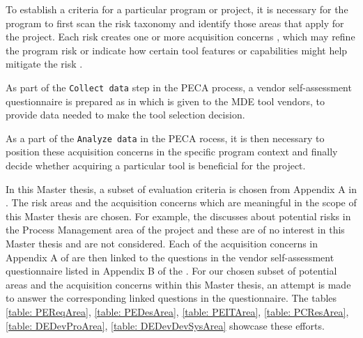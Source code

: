 To establish a criteria for a particular program or project, it is necessary for the program to first scan the risk taxonomy and identify those areas that apply for the project. Each risk creates one or more acquisition concerns , which may refine the program risk or indicate how certain tool features or capabilities might help mitigate the risk \cite{EvalCodeGen}.      

As part of the \texttt{Collect data} step in the PECA process, a vendor self-assessment questionnaire is prepared as in \cite{EvalCodeGen} which is given to the MDE tool vendors, to provide data needed to make the tool selection decision.

As a part of the \texttt{Analyze data} in the PECA rocess, it is then necessary to position these acquisition concerns in the specific program context and finally decide whether acquiring a particular tool is beneficial for the project.

In this Master thesis, a subset of evaluation criteria is chosen from Appendix A in \cite{EvalCodeGen}. The risk areas and the acquisition concerns which are meaningful in the scope of this Master thesis are chosen. For example, the \cite{EvalCodeGen} discusses about potential risks in the Process Management area of the project and these are of no interest in this Master thesis and are not considered. Each of the acquisition concerns in Appendix A of \cite{EvalCodeGen} are then linked to the questions in the vendor self-assessment questionnaire listed in Appendix B of the \cite{EvalCodeGen}. For our chosen subset of potential areas and the acquisition concerns within this Master thesis, an attempt is made to answer the corresponding linked questions in the questionnaire. The tables \cref{table: PEReqArea}, \cref{table: PEDesArea}, \cref{table: PEITArea}, \cref{table: PCResArea}, \cref{table: DEDevProArea}, \cref{table: DEDevDevSysArea} showcase these efforts.   

